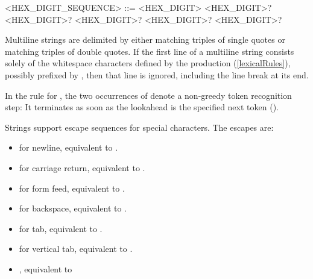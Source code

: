 \documentclass[makeidx]{article}
\begin{document}
{\begin{grammar}
<HEX\_DIGIT\_SEQUENCE> ::= \gnewline{}
  <HEX\_DIGIT> <HEX\_DIGIT>? <HEX\_DIGIT>?
  \gnewline{} <HEX\_DIGIT>? <HEX\_DIGIT>? <HEX\_DIGIT>?
\end{grammar}

\LMHash{}%
Multiline strings are delimited by either
matching triples of single quotes or
matching triples of double quotes.
If the first line of a multiline string consists solely of
the whitespace characters defined by the production 
(\ref{lexicalRules}),
possibly prefixed by ,
then that line is ignored,
including the line break at its end.


\LMHash{}%
In the rule for ,
the two occurrences of 
denote a non-greedy token recognition step:
It terminates as soon as the lookahead is the specified next token
().


\LMHash{}%
Strings support escape sequences for special characters.
The escapes are:
\begin{itemize}
\item
   for newline, equivalent to .
\item
   for carriage return, equivalent to .
\item
   for form feed, equivalent to .
\item
   for backspace, equivalent to .
\item
   for tab, equivalent to .
\item
   for vertical tab, equivalent to .
\item
  , equivalent to


\end{itemize}}
\end{document}
